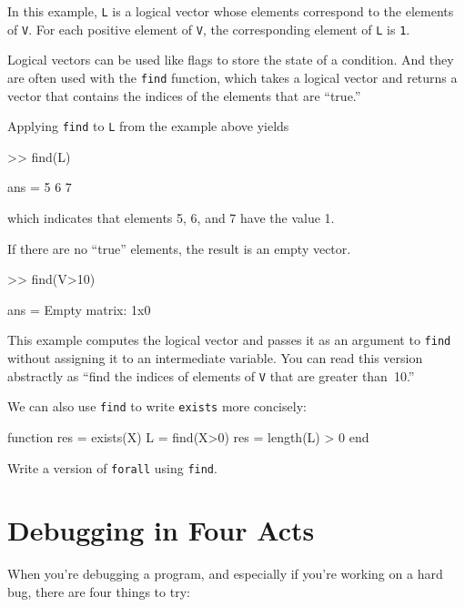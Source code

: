 \documentclass[../../book.tex]{subfiles}
\begin{document}
In this example, \lstinline{L} is a logical vector whose elements
correspond to the elements of \lstinline{V}.  For each positive element of
\lstinline{V}, the corresponding element of \lstinline{L} is \lstinline{1}.

Logical vectors can be used like flags to store the state of
a condition.  And they are often used with the \lstinline{find} function,
which takes a logical vector and returns a vector that contains
the indices of the elements that are ``true.''


Applying \lstinline{find} to \lstinline{L} from the example above yields

\begin{code}
>> find(L)

ans = 5     6     7
\end{code}
which indicates that elements 5, 6, and 7 have the value 1.

If there are no ``true'' elements, the result is an empty vector.

\begin{code}
>> find(V>10)

ans = Empty matrix: 1x0
\end{code}

This example computes the logical vector and passes it as an
argument to \lstinline{find} without assigning it to an intermediate
variable.  You can read this version abstractly as ``find
the indices of elements of \lstinline{V} that are greater than~10.''

We can also use \lstinline{find} to write \lstinline{exists} more concisely:

\begin{code}
function res = exists(X)
    L = find(X>0)
    res = length(L) > 0
end
\end{code}

\begin{ex}
Write a version of \lstinline{forall} using \lstinline{find}.
\end{ex}


\section{Debugging in Four Acts}


When you're debugging a program, and especially if you're working on a hard bug, there are four things to try:
\end{document}
